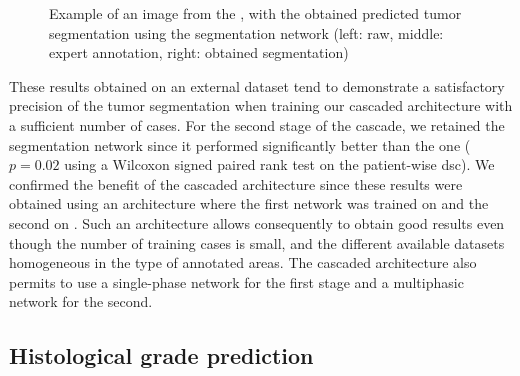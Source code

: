\begin{figure}[ht!]
\begin{minipage}{0.3\linewidth}
	\end{minipage}
	\caption{Example of an image from the \textbf{}, with the obtained predicted tumor segmentation using the  segmentation network (left: raw, middle: expert annotation, right: obtained segmentation)}
	\label{fig:TCIAMultiphaseTumorPred}
\end{figure}

These results obtained on an external dataset tend to demonstrate a satisfactory precision
of the tumor segmentation when training our cascaded architecture with a
sufficient number of cases.
For the second stage of the cascade, we retained the  segmentation network since it performed
significantly better than the  one ($ p = 0.02 $ using a Wilcoxon signed
paired rank test on the patient-wise \ac{dsc}).
We confirmed the benefit of the cascaded architecture since these results
were obtained using an architecture where the first network was trained
on \textbf{} and the second on \textbf{}. Such an architecture allows consequently to obtain good results even though the number of training cases is small, and the different available datasets homogeneous in the type of annotated areas. The cascaded architecture also permits to use a single-phase network for the first stage and a multiphasic network for the second.

\subsection{Histological grade prediction}

